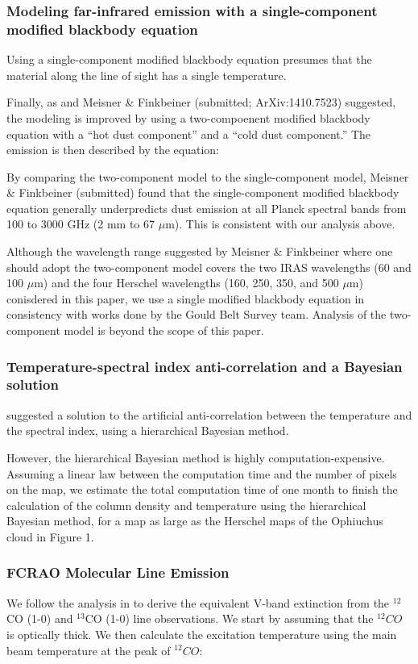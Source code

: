 \documentclass[11pt,a4paper]{emulateapj}
\begin{document}
\subsubsection{Modeling far-infrared emission with a single-component modified blackbody equation}
Using a single-component modified blackbody equation presumes that the material along the line of sight has a single temperature.

Finally, as \citet{Finkbeiner_1999} and Meisner \& Finkbeiner (submitted; ArXiv:1410.7523) suggested, the modeling is improved by using a two-compoenent modified blackbody equation with a ``hot dust component'' and a ``cold dust component.'' The emission is then described by the equation:

By comparing the two-component model to the single-component model, Meisner \& Finkbeiner (submitted) found that the single-component modified blackbody equation generally underpredicts dust emission at all Planck spectral bands from 100 to 3000 GHz (2 mm to 67 $\mu$m). This is consistent with our analysis above.

Although the wavelength range suggested by Meisner \& Finkbeiner where one should adopt the two-component model covers the two IRAS wavelengths (60 and 100 $\mu$m) and the four Herschel wavelengths (160, 250, 350, and 500 $\mu$m) conisdered in this paper, we use a single modified blackbody equation in consistency with works done by the Gould Belt Survey team. Analysis of the two-component model is beyond the scope of this paper.

\subsubsection{Temperature-spectral index anti-correlation and a Bayesian solution}

\citet{Kelly_2012} suggested a solution to the artificial anti-correlation between the temperature and the spectral index, using a hierarchical Bayesian method.

However, the hierarchical Bayesian method is highly computation-expensive. Assuming a linear law between the computation time and the number of pixels on the map, we estimate the total computation time of one month to finish the calculation of the column density and temperature using the hierarchical Bayesian method, for a map as large as the Herschel maps of the Ophiuchus cloud in Figure 1.

\subsubsection{FCRAO Molecular Line Emission}
We follow the analysis in \citet{Pineda_2008} to derive the equivalent V-band extinction from the $^{12}$CO (1-0) and $^{13}$CO (1-0) line observations. We start by assuming that the $^{12}CO$ is optically thick. We then calculate the excitation temperature using the main beam temperature at the peak of $^{12}CO$:
\end{document}
